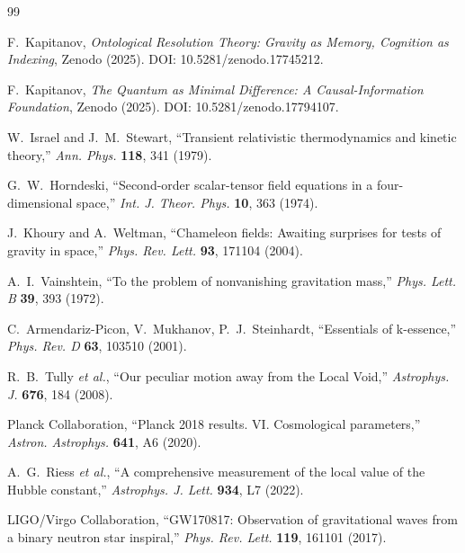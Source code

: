 \documentclass[12pt, a4paper]{article}
\begin{document}
\newpage
\begin{thebibliography}{99}

F.~Kapitanov,
\textit{Ontological Resolution Theory: Gravity as Memory, Cognition as Indexing},
Zenodo (2025).
DOI: 10.5281/zenodo.17745212.

F.~Kapitanov,
\textit{The Quantum as Minimal Difference: A Causal-Information Foundation},
Zenodo (2025).
DOI: 10.5281/zenodo.17794107.

W.~Israel and J.~M.~Stewart,
``Transient relativistic thermodynamics and kinetic theory,''
\textit{Ann. Phys.} \textbf{118}, 341 (1979).

G.~W.~Horndeski,
``Second-order scalar-tensor field equations in a four-dimensional space,''
\textit{Int. J. Theor. Phys.} \textbf{10}, 363 (1974).

J.~Khoury and A.~Weltman,
``Chameleon fields: Awaiting surprises for tests of gravity in space,''
\textit{Phys. Rev. Lett.} \textbf{93}, 171104 (2004).

A.~I.~Vainshtein,
``To the problem of nonvanishing gravitation mass,''
\textit{Phys. Lett. B} \textbf{39}, 393 (1972).

C.~Armendariz-Picon, V.~Mukhanov, P.~J.~Steinhardt,
``Essentials of k-essence,''
\textit{Phys. Rev. D} \textbf{63}, 103510 (2001).

R.~B.~Tully \textit{et al.},
``Our peculiar motion away from the Local Void,''
\textit{Astrophys. J.} \textbf{676}, 184 (2008).

Planck Collaboration,
``Planck 2018 results. VI. Cosmological parameters,''
\textit{Astron. Astrophys.} \textbf{641}, A6 (2020).

A.~G.~Riess \textit{et al.},
``A comprehensive measurement of the local value of the Hubble constant,''
\textit{Astrophys. J. Lett.} \textbf{934}, L7 (2022).

LIGO/Virgo Collaboration,
``GW170817: Observation of gravitational waves from a binary neutron star inspiral,''
\textit{Phys. Rev. Lett.} \textbf{119}, 161101 (2017).

\end{thebibliography}
\end{document}
